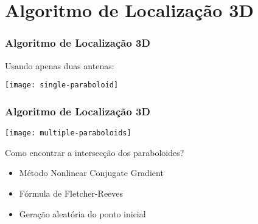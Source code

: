 \section{Algoritmo de Localização 3D}
\begin{frame}
    \frametitle{Algoritmo de Localização 3D}
    Usando apenas \alert{duas antenas}:

    \begin{center}
        \texttt{[image: single-paraboloid]}
    \end{center}
\end{frame}

\begin{frame}
    \frametitle{Algoritmo de Localização 3D}
    \begin{center}
        \texttt{[image: multiple-paraboloids]}
    \end{center}

    Como encontrar a \alert{intersecção dos paraboloides}?
    \begin{itemize}
        \item Método \alert{Nonlinear Conjugate Gradient}
        \item Fórmula de \alert{Fletcher-Reeves}
        \item \alert{Geração aleatória do ponto inicial}
    \end{itemize}
\end{frame}
